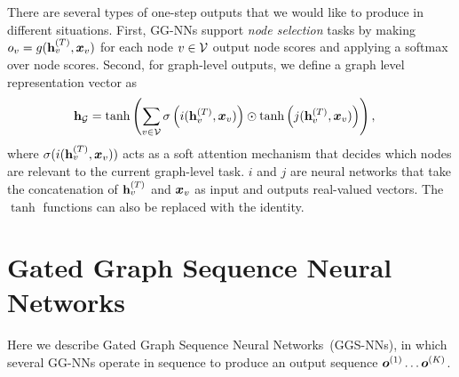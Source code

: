 \documentclass{article} %
\newcommand{\OurMethodMinorShort}{GG-NN}
\newcommand{\OurMethodMinorShorts}{\OurMethodMinorShort s}
\newcommand{\OurMethod}{Gated Graph Sequence Neural Network}
\newcommand{\OurMethods}{\OurMethod s}
\newcommand{\OurMethodShort}{GGS-NN}
\newcommand{\OurMethodShorts}{\OurMethodShort s}
\begin{document}
There are several types of one-step outputs that we would like to
produce in different situations. 
First, \OurMethodMinorShorts{} support \emph{node selection} tasks by making 
$o_{v} = g(\mathbf{h}_{v}^{(T)}, \boldsymbol{x}_{v})$ for each node $v
\in \mathcal{V}$
output node scores and applying a softmax over node scores.
Second, for graph-level outputs, we define a graph level representation vector as
\begin{align}
  \mathbf{h}_{\mathcal{G}} & = \tanh \left(\sum_{v \in \mathcal{V}}
  \sigma\left(i(\mathbf{h}_{v}^{(T)}, \boldsymbol{x}_{v})\right) \odot
  \tanh \left(j(\mathbf{h}_{v}^{(T)}, \boldsymbol{x}_{v})\right)\right),
  \label{eq:graph-representation}
\end{align}
%
where $\sigma(i(\mathbf{h}_{v}^{(T)}, \boldsymbol{x}_{v}))$ acts as a soft attention
mechanism that decides which nodes are relevant to the current graph-level
task. $i$ and $j$ are 
neural networks that
take the concatenation of $\mathbf{h}_{v}^{(T)}$ and $\boldsymbol{x}_v$ as input and outputs
real-valued vectors. The $\tanh$ functions can also be replaced with the identity.

\section{\OurMethods}

Here we describe \OurMethods~(\OurMethodShorts), in which several
\OurMethodMinorShorts{} operate in sequence to produce an output sequence
$\boldsymbol{o}^{(1)} \ldots \boldsymbol{o}^{(K)}$.
\end{document}
